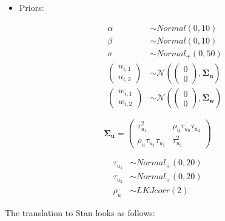 \documentclass[12pt,]{krantz}
\providecommand{\tightlist}{%
  \setlength{\itemsep}{0pt}\setlength{\parskip}{0pt}}
\theoremstyle{definition}
\theoremstyle{definition}
\theoremstyle{definition}
\theoremstyle{remark}
\begin{document}
\begin{itemize}
\tightlist
\item
  Priors:

  \begin{equation}
   \begin{aligned} 
     \alpha & \sim Normal(0,10) \\
     \beta  & \sim Normal(0,10) \\
  \sigma  &\sim Normal_+(0, 50)\\
  {\begin{pmatrix}
  u_{i,1} \\
  u_{i,2}
  \end{pmatrix}}
     &\sim {\mathcal {N}}
  \left(
     {\begin{pmatrix} 
  0\\
  0
     \end{pmatrix}}
   ,\boldsymbol{\Sigma_u} \right) \\
   {\begin{pmatrix}
  w_{i,1} \\
  w_{i,2}
  \end{pmatrix}}
     &\sim {\mathcal {N}}
  \left(
     {\begin{pmatrix} 
  0\\
  0
     \end{pmatrix}}
   ,\boldsymbol{\Sigma_w} \right)
   \end{aligned}
   \end{equation}
\end{itemize}

\begin{equation}
\boldsymbol{\Sigma_u} = 
{\begin{pmatrix} 
\tau_{u_1}^2 & \rho_u \tau_{u_0} \tau_{u_2} \\ 
\rho_u \tau_{u_1} \tau_{u_1} & \tau_{u_2}^2
\end{pmatrix}}
\end{equation}

\begin{equation}
\begin{aligned}
\tau_{u_1} &\sim Normal_+(0,20)\\
\tau_{u_2} &\sim Normal_+(0,20)\\
\rho_u &\sim LKJcorr(2) 
\end{aligned}
\end{equation}

The translation to Stan looks as follows:
\end{document}
